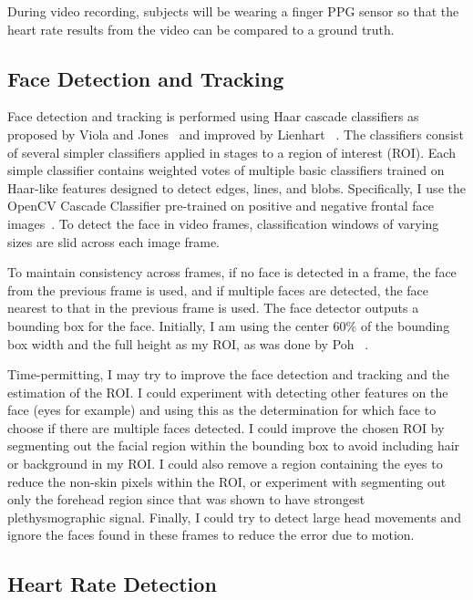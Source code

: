 \documentclass[11pt,twocolumn,letterpaper]{article}
\begin{document}
During video recording, subjects will be wearing a finger PPG sensor so that the heart rate results from the video can be compared to a ground truth.

\subsection*{Face Detection and Tracking}

Face detection and tracking is performed using Haar cascade classifiers as proposed by Viola and Jones~\cite{Viola:2001aa} and improved by Lienhart \etal~\cite{Leinhart:2002aa}. The classifiers consist of several simpler classifiers applied in stages to a region of interest (ROI). Each simple classifier contains weighted votes of multiple basic classifiers trained on Haar-like features designed to detect edges, lines, and blobs. Specifically, I use the OpenCV Cascade Classifier pre-trained on positive and negative frontal face images~\cite{opencv_library}. To detect the face in video frames, classification windows of varying sizes are slid across each image frame.

To maintain consistency across frames, if no face is detected in a frame, the face from the previous frame is used, and if multiple faces are detected, the face nearest to that in the previous frame is used. The face detector outputs a bounding box for the face. Initially, I am using the center 60\% of the bounding box width and the full height as my ROI, as was done by Poh \etal~\cite{Poh:2010aa}.

Time-permitting, I may try to improve the face detection and tracking and the estimation of the ROI. I could experiment with detecting other features on the face (eyes for example) and using this as the determination for which face to choose if there are multiple faces detected. I could improve the chosen ROI by segmenting out the facial region within the bounding box to avoid including hair or background in my ROI. I could also remove a region containing the eyes to reduce the non-skin pixels within the ROI, or experiment with segmenting out only the forehead region since that was shown to have strongest plethysmographic signal. Finally, I could try to detect large head movements and ignore the faces found in these frames to reduce the error due to motion.

\subsection*{Heart Rate Detection}
\end{document}
